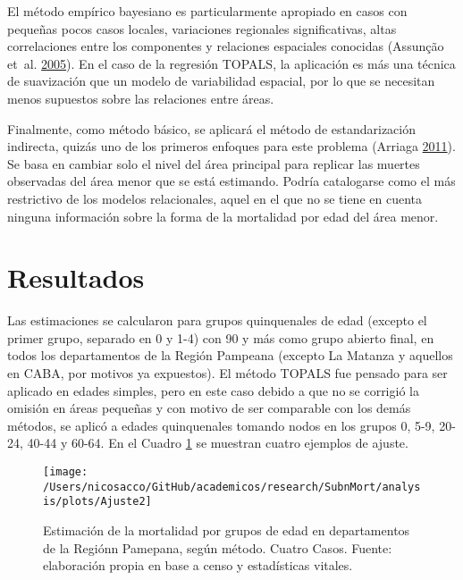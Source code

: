 \documentclass[12pt,spanish,]{article}
\begin{document}
El método empírico bayesiano es particularmente apropiado en casos con
pequeñas pocos casos locales, variaciones regionales significativas,
altas correlaciones entre los componentes y relaciones espaciales
conocidas (Assunção et~al. \protect\hyperlink{ref-Assuncao2005}{2005}).
En el caso de la regresión TOPALS, la aplicación es más una técnica de
suavización que un modelo de variabilidad espacial, por lo que se
necesitan menos supuestos sobre las relaciones entre áreas.

Finalmente, como método básico, se aplicará el método de estandarización
indirecta, quizás uno de los primeros enfoques para este problema
(Arriaga \protect\hyperlink{ref-Arriaga2011}{2011}). Se basa en cambiar
solo el nivel del área principal para replicar las muertes observadas
del área menor que se está estimando. Podría catalogarse como el más
restrictivo de los modelos relacionales, aquel en el que no se tiene en
cuenta ninguna información sobre la forma de la mortalidad por edad del
área menor.

\hypertarget{resultados}{%
\section{Resultados}\label{resultados}}

Las estimaciones se calcularon para grupos quinquenales de edad (excepto
el primer grupo, separado en 0 y 1-4) con 90 y más como grupo abierto
final, en todos los departamentos de la Región Pampeana (excepto La
Matanza y aquellos en CABA, por motivos ya expuestos). El método TOPALS
fue pensado para ser aplicado en edades simples, pero en este caso
debido a que no se corrigió la omisión en áreas pequeñas y con motivo de
ser comparable con los demás métodos, se aplicó a edades quinquenales
tomando nodos en los grupos 0, 5-9, 20-24, 40-44 y 60-64. En el Cuadro
\ref{fig:Ajuste} se muestran cuatro ejemplos de ajuste.

\begin{figure}

{\centering \texttt{[image: /Users/nicosacco/GitHub/academicos/research/SubnMort/analysis/plots/Ajuste2]} 

}

\caption{Estimación de la mortalidad por grupos de edad en departamentos de la Regiónn Pamepana, según método. Cuatro Casos. Fuente: elaboración propia en base a censo y estadísticas vitales.}\label{fig:Ajuste}
\end{figure}
\end{document}
